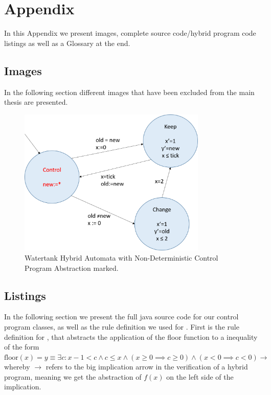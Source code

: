 


\chapter{Appendix}
\label{chap:appendix}
In this Appendix we present images, complete source code/hybrid program code listings as well as a Glossary at the end.

\section{Images}
\label{app:sec:images}

In the following section different images that have been excluded from the main thesis are presented.

	\begin{figure}[h!]
		\centering
		\includegraphics[height=0.5\textheight,width=0.8\textwidth]{Images/ha_control}
		\caption{Watertank Hybrid  Automata with Non-Deterministic Control Program Abstraction marked.}
		\label{fig:ex_control}
	\end{figure}

\section{Listings}
\label{app:sec:listings}

In the following section we present the full java source code for our control program classes, as well as the rule definition we used for \keym. First is the rule definition for \keym, that abstracts the application of the floor function to a inequality of the form \(\textrm{floor}(x) = y \equiv \exists c:x-1 < c \wedge c \leq x \wedge (x \geq 0 \implies c \geq 0) \wedge (x < 0 \implies c < 0)  \longrightarrow\) whereby \(\longrightarrow\) refers to the big implication arrow in the verification of a hybrid program, meaning we get the abstraction of \(f(x)\) on the left side of the implication.

